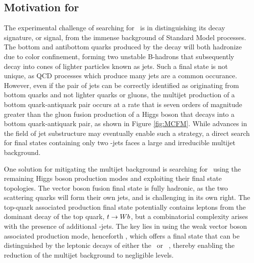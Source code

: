 \subsection{Motivation for \VHbb}

The experimental challenge of searching for \Hbb\ is in distinguishing its decay signature, or signal, from the immense background of Standard Model processes. The bottom and antibottom quarks produced by the decay will both hadronize due to color confinement, forming two unstable B-hadrons that subsequently decay into cones of lighter particles known as jets. Such a final state is not unique, as QCD processes which produce many jets are a common occurance. However, even if the pair of jets can be correctly identified as originating from bottom quarks and not lighter quarks or gluons, the multijet production of a bottom quark-antiquark pair occurs at a rate that is seven orders of magnitude greater than the gluon fusion production of a Higgs boson that decays into a bottom quark-antiquark pair, as shown in Figure \ref{fig:MCFM}. While advances in the field of jet substructure may eventually enable such a strategy\cite{ggHbb}, a direct search for final states containing only two \qrkb-jets faces a large and irreducible multijet background.

One solution for mitigating the multijet background is searching for \Hbb\ using the remaining Higgs boson production modes and exploiting their final state topologies. The vector boson fusion final state is fully hadronic, as the two scattering quarks will form their own jets, and is challenging in its own right. The top-quark associated production final state potentially contains leptons from the dominant decay of the top quark, $t \rightarrow Wb$, but a combinatorial complexity arises with the presence of additional \qrkb-jets. The key lies in using the weak vector boson associated production mode, henceforth \VHbb, which offers a final state that can be distinguished by the leptonic decays of either the \bosW\ or \bosZ\ , thereby enabling the reduction of the multijet background to negligible levels.

